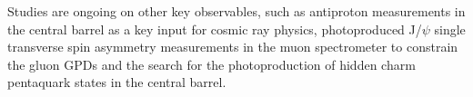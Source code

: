 \documentclass[../report.tex]{subfiles}
\begin{document}
Studies are ongoing on other key observables, such as antiproton measurements in the central barrel as a key input for cosmic ray physics, photoproduced J/$\psi$ single transverse spin asymmetry measurements in the muon spectrometer to constrain the gluon GPDs and the search for the photoproduction of hidden charm pentaquark states in the central barrel.
\end{document}
